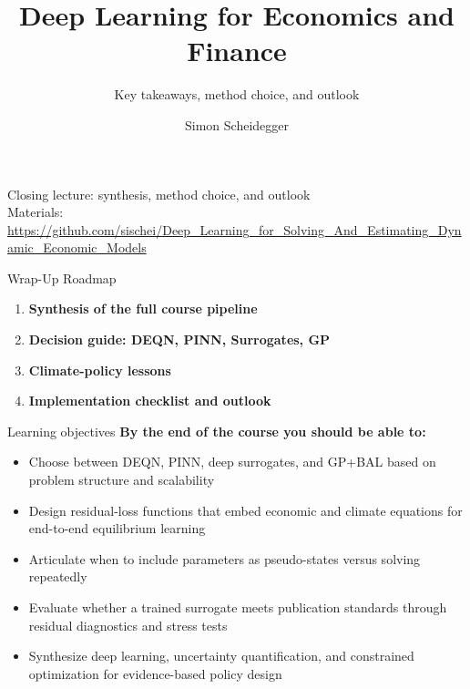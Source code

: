 \documentclass[aspectratio=169,11pt]{beamer}
\title[Deep Learning for Dynamic Economic Models]
{Deep Learning for Economics and Finance}
\subtitle{Key takeaways, method choice, and outlook}
\author{Simon Scheidegger}
\institute[HEC Lausanne]{HEC, University of Lausanne}
\date{}
\begin{document}
{
\begin{frame}
\titlepage
\vspace{-0.4cm}
\begin{center}
{\footnotesize Closing lecture: synthesis, method choice, and outlook}\\[4pt]
{\footnotesize Materials: \url{https://github.com/sischei/Deep_Learning_for_Solving_And_Estimating_Dynamic_Economic_Models}}
\end{center}
\end{frame}
}

\begin{frame}{Wrap-Up Roadmap}
\begin{enumerate}
    \item \textbf{Synthesis of the full course pipeline}
    \item \textbf{Decision guide: DEQN, PINN, Surrogates, GP}
    \item \textbf{Climate-policy lessons}
    \item \textbf{Implementation checklist and outlook}
\end{enumerate}
\end{frame}

\begin{frame}{Learning objectives}
\textbf{By the end of the course you should be able to:}
\begin{itemize}
  \item Choose between DEQN, PINN, deep surrogates, and GP+BAL based on problem structure and scalability
  \item Design residual-loss functions that embed economic and climate equations for end-to-end equilibrium learning
  \item Articulate when to include parameters as pseudo-states versus solving repeatedly
  \item Evaluate whether a trained surrogate meets publication standards through residual diagnostics and stress tests
  \item Synthesize deep learning, uncertainty quantification, and constrained optimization for evidence-based policy design
\end{itemize}
\end{frame}
\end{document}
